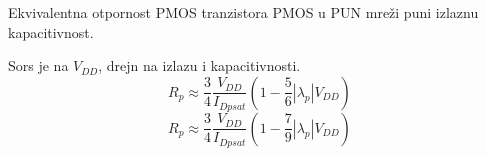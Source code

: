 \begin{frame}[label=09_1-s034]{Ekvivalentna otpornost PMOS tranzistora}\setlength{\parskip}{2pt}\setlength{\abovedisplayskip}{4pt}\setlength{\belowdisplayskip}{4pt}\setlength{\abovedisplayshortskip}{3pt}\setlength{\belowdisplayshortskip}{3pt}
PMOS u PUN mreži puni izlaznu kapacitivnost.\begin{center}\hspace{12mm}\end{center}Sors je na $V_{DD}$, drejn na izlazu i kapacitivnosti.\[R_p\approx\frac34\frac{V_{DD}}{I_{Dpsat}}\left(1-\frac56|\lambda_p|V_{DD}\right)\]
\[R_p\approx\frac34\frac{V_{DD}}{I_{Dpsat}}\left(1-\frac79|\lambda_p|V_{DD}\right)\]

\end{frame}
